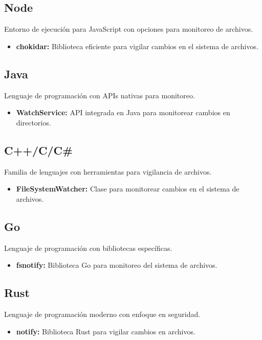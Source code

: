 \subsection{Node}
Entorno de ejecución para JavaScript con opciones para monitoreo de archivos.

\begin{itemize}
    \item \textbf{chokidar:} Biblioteca eficiente para vigilar cambios en el sistema de archivos.
\end{itemize}

\subsection{Java}
Lenguaje de programación con APIs nativas para monitoreo.

\begin{itemize}
    \item \textbf{WatchService:} API integrada en Java para monitorear cambios en directorios.
\end{itemize}

\subsection{C++/C/C\#}
Familia de lenguajes con herramientas para vigilancia de archivos.

\begin{itemize}
    \item \textbf{FileSystemWatcher:} Clase para monitorear cambios en el sistema de archivos.
\end{itemize}

\subsection{Go}
Lenguaje de programación con bibliotecas específicas.

\begin{itemize}
    \item \textbf{fsnotify:} Biblioteca Go para monitoreo del sistema de archivos.
\end{itemize}

\subsection{Rust}
Lenguaje de programación moderno con enfoque en seguridad.

\begin{itemize}
    \item \textbf{notify:} Biblioteca Rust para vigilar cambios en archivos.
\end{itemize}

